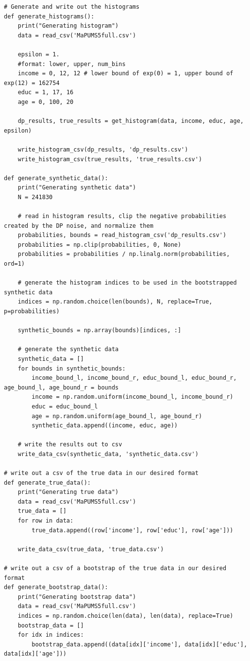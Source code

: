 \documentclass[12pt]{article}
\begin{document}
\begin{appendices}
\begin{lstlisting}
# Generate and write out the histograms
def generate_histograms():
    print("Generating histogram")
    data = read_csv('MaPUMS5full.csv')

    epsilon = 1.
    #format: lower, upper, num_bins
    income = 0, 12, 12 # lower bound of exp(0) = 1, upper bound of exp(12) = 162754
    educ = 1, 17, 16
    age = 0, 100, 20

    dp_results, true_results = get_histogram(data, income, educ, age, epsilon)

    write_histogram_csv(dp_results, 'dp_results.csv')
    write_histogram_csv(true_results, 'true_results.csv')

def generate_synthetic_data():
    print("Generating synthetic data")
    N = 241830

    # read in histogram results, clip the negative probabilities created by the DP noise, and normalize them
    probabilities, bounds = read_histogram_csv('dp_results.csv')
    probabilities = np.clip(probabilities, 0, None)
    probabilities = probabilities / np.linalg.norm(probabilities, ord=1)

    # generate the histogram indices to be used in the bootstrapped synthetic data
    indices = np.random.choice(len(bounds), N, replace=True, p=probabilities)

    synthetic_bounds = np.array(bounds)[indices, :]

    # generate the synthetic data
    synthetic_data = []
    for bounds in synthetic_bounds:
        income_bound_l, income_bound_r, educ_bound_l, educ_bound_r, age_bound_l, age_bound_r = bounds
        income = np.random.uniform(income_bound_l, income_bound_r)
        educ = educ_bound_l
        age = np.random.uniform(age_bound_l, age_bound_r)
        synthetic_data.append((income, educ, age))

    # write the results out to csv
    write_data_csv(synthetic_data, 'synthetic_data.csv')

# write out a csv of the true data in our desired format
def generate_true_data():
    print("Generating true data")
    data = read_csv('MaPUMS5full.csv')
    true_data = []
    for row in data:
        true_data.append((row['income'], row['educ'], row['age']))

    write_data_csv(true_data, 'true_data.csv')

# write out a csv of a bootstrap of the true data in our desired format
def generate_bootstrap_data():
    print("Generating bootstrap data")
    data = read_csv('MaPUMS5full.csv')
    indices = np.random.choice(len(data), len(data), replace=True)
    bootstrap_data = []
    for idx in indices:
        bootstrap_data.append((data[idx]['income'], data[idx]['educ'], data[idx]['age']))


\end{lstlisting}
\end{appendices}
\end{document}
